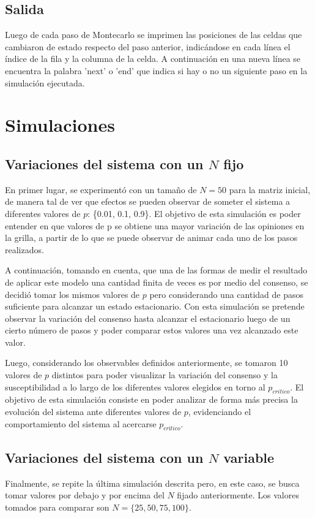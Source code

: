\documentclass[12pt]{article}
\begin{document}
\subsection{Salida}
Luego de cada paso de Montecarlo se imprimen las posiciones de las celdas que cambiaron de estado respecto del paso anterior, indicándose en cada línea el índice de la fila y la columna de la celda. A continuación en una nueva línea se encuentra la palabra 'next' o 'end' que indica si hay o no un siguiente paso en la simulación ejecutada.

\section{Simulaciones}
\subsection{Variaciones del sistema con un $N$ fijo}
En primer lugar, se experimentó con un tamaño de $N = 50$ para la matriz inicial, de manera tal de ver que efectos se pueden observar de someter el sistema a diferentes valores de $p$: \{0.01, 0.1, 0.9\}. El objetivo de esta simulación es poder entender en que valores de p se obtiene una mayor variación de las opiniones en la grilla, a partir de lo que se puede observar de animar cada uno de los pasos realizados.

A continuación, tomando en cuenta, que una de las formas de medir el resultado de aplicar este modelo una cantidad finita de veces es por medio del consenso, se decidió tomar los mismos valores de $p$ pero considerando una cantidad de pasos suficiente para alcanzar un estado estacionario. Con esta simulación se pretende observar la variación del consenso hasta alcanzar el estacionario luego de un cierto número de pasos y poder comparar estos valores una vez alcanzado este valor. 

Luego, considerando los observables definidos anteriormente, se tomaron 10 valores de $p$ distintos para poder visualizar la variación del consenso y la susceptibilidad a lo largo de los diferentes valores elegidos en torno al $p_{critico}$. El objetivo de esta simulación consiste en poder analizar de forma más precisa la evolución del sistema ante diferentes valores de $p$, evidenciando el comportamiento del sistema al acercarse $p_{crítico}$.

\subsection{Variaciones del sistema con un $N$ variable}
Finalmente, se repite la última simulación descrita pero, en este caso, se busca tomar valores por debajo y por encima del $N$ fijado anteriormente. Los valores tomados para comparar son $N = \{25,50,75,100\}$. 
 
\end{document}
